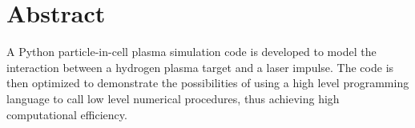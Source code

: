 \section{Abstract} %
A Python particle-in-cell plasma simulation code is developed to model the interaction between a hydrogen plasma target
and a laser impulse. The code is then optimized to demonstrate the possibilities of using a high level programming
language to call low level numerical procedures, thus achieving high computational efficiency.
